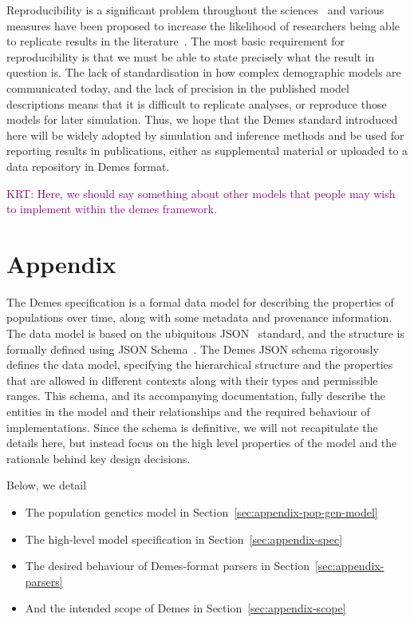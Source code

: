 \documentclass[11pt]{article}
\newcommand{\krtcomment}[1]{{\textcolor{purple}{KRT: #1}}}
\begin{document}
Reproducibility is a significant problem throughout the
sciences~\citep{baker20161} and various measures have been
proposed to increase the likelihood of researchers being
able to replicate results in the
literature~\citep{munafo2017manifesto}. The most basic requirement
for reproducibility is that we must be able to state precisely what
the result in question is. The lack of standardisation in how
complex demographic models are communicated today, and the lack of
precision in the published model descriptions means that it is difficult
to replicate analyses, or reproduce those models for later simulation.
Thus, we hope that the Demes standard introduced here will be widely adopted
by simulation and inference methods and be used for reporting results in
publications, either as supplemental material or uploaded to a data
repository in Demes format.

\krtcomment{Here, we should say something about other models that people may wish to implement within the demes
framework.}





\renewcommand{\thefigure}{A\arabic{figure}}
\renewcommand{\thetable}{A\arabic{table}}
\renewcommand{\theequation}{A\arabic{equation}}
\renewcommand{\thesection}{A\arabic{section}}
\setcounter{figure}{0}
\setcounter{table}{0}
\setcounter{equation}{0}

\section*{Appendix}

The Demes specification is a formal data model for describing
the properties of populations over time,
along with some metadata and provenance information.
The data model is based on the ubiquitous JSON~\citep{bray2017javascript}
standard, and the structure is formally defined using
JSON Schema~\citep{wright2020json}.
The Demes JSON schema rigorously defines the data model,
specifying the hierarchical structure and the properties that are allowed in different
contexts along with their types and permissible ranges.
This schema, and its accompanying documentation,
fully describe the entities in the model and their
relationships and the required behaviour of implementations.
Since the schema is definitive, we will not recapitulate the details
here, but instead focus on the high level properties of the model and
the rationale behind key design decisions.

Below, we detail
\begin{itemize}
    \item The population genetics model in Section~\ref{sec:appendix-pop-gen-model}
    \item The high-level model specification in Section~\ref{sec:appendix-spec}
    \item The desired behaviour of Demes-format parsers in Section~\ref{sec:appendix-parsers}
    \item And the intended scope of Demes in Section~\ref{sec:appendix-scope}
\end{itemize}
\end{document}
